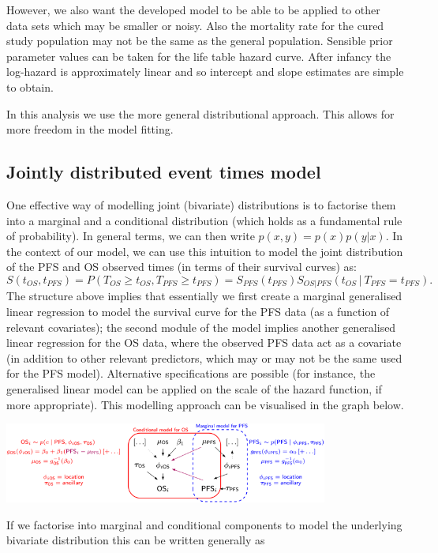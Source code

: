 \documentclass[
]{article}
\begin{document}
However, we also want the developed model to be able to be applied to
other data sets which may be smaller or noisy. Also the mortality rate
for the cured study population may not be the same as the general
population. Sensible prior parameter values can be taken for the life
table hazard curve. After infancy the log-hazard is approximately linear
and so intercept and slope estimates are simple to obtain.

In this analysis we use the more general distributional approach. This
allows for more freedom in the model fitting.

\hypertarget{jointly-distributed-event-times-model}{%
\subsection{Jointly distributed event times
model}\label{jointly-distributed-event-times-model}}

One effective way of modelling joint (bivariate) distributions is to
factorise them into a marginal and a conditional distribution (which
holds as a fundamental rule of probability). In general terms, we can
then write \(p(x,y) = p(x)p(y | x)\). In the context of our model, we
can use this intuition to model the joint distribution of the PFS and OS
observed times (in terms of their survival curves) as: \[
S(t_{OS},t_{PFS}) = P⁡(T_{OS} \geq t_{OS}, T_{PFS} \geq t_{PFS})
= S_{PFS} (t_{PFS}) S_{OS|PFS}(t_{OS}│T_{PFS} = t_{PFS}).
\] The structure above implies that essentially we first create a
marginal generalised linear regression to model the survival curve for
the PFS data (as a function of relevant covariates); the second module
of the model implies another generalised linear regression for the OS
data, where the observed PFS data act as a covariate (in addition to
other relevant predictors, which may or may not be the same used for the
PFS model). Alternative specifications are possible (for instance, the
generalised linear model can be applied on the scale of the hazard
function, if more appropriate). This modelling approach can be
visualised in the graph below.

\includegraphics[width=0.8\textwidth,height=\textheight]{DAG.png}

If we factorise into marginal and conditional components to model the
underlying bivariate distribution this can be written generally as
\end{document}
